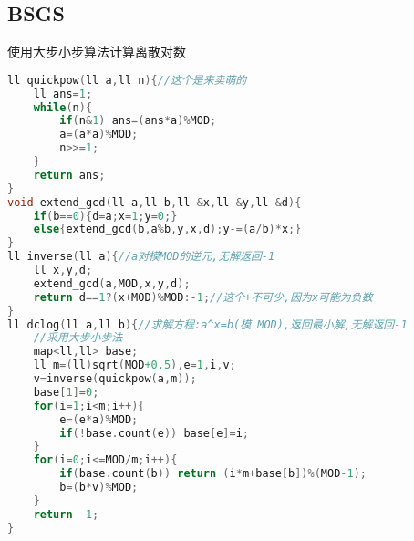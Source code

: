 \subsection{BSGS}
使用大步小步算法计算离散对数
\begin{lstlisting}[language=C]
ll quickpow(ll a,ll n){//这个是来卖萌的
	ll ans=1;
	while(n){
		if(n&1) ans=(ans*a)%MOD;
		a=(a*a)%MOD;
		n>>=1;
	}
	return ans;
}
void extend_gcd(ll a,ll b,ll &x,ll &y,ll &d){
	if(b==0){d=a;x=1;y=0;}
	else{extend_gcd(b,a%b,y,x,d);y-=(a/b)*x;}
}
ll inverse(ll a){//a对模MOD的逆元,无解返回-1
	ll x,y,d;
	extend_gcd(a,MOD,x,y,d);
	return d==1?(x+MOD)%MOD:-1;//这个+不可少,因为x可能为负数
}
ll dclog(ll a,ll b){//求解方程:a^x=b(模 MOD),返回最小解,无解返回-1
	//采用大步小步法
	map<ll,ll> base;
	ll m=(ll)sqrt(MOD+0.5),e=1,i,v;
	v=inverse(quickpow(a,m));
	base[1]=0;
	for(i=1;i<m;i++){
		e=(e*a)%MOD;
		if(!base.count(e)) base[e]=i;
	}
	for(i=0;i<=MOD/m;i++){
		if(base.count(b)) return (i*m+base[b])%(MOD-1);
		b=(b*v)%MOD;
	}
	return -1;
}

\end{lstlisting}
